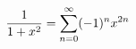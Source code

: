 \documentclass[preview]{standalone}
\begin{document}
\begin{align*}
\special{dvisvgm:raw <g id='unique000'>}\dfrac{1}{1+x^2}=\displaystyle\sum_{n=0}^{\infty}(-1)^nx^{2n}\special{dvisvgm:raw </g>}
\end{align*}
\end{document}

